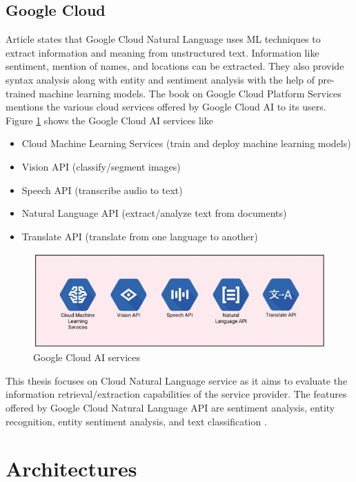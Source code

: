 \subsection{Google Cloud}
Article \cite{kozlenko2021machine} states that Google Cloud Natural Language uses \acs{ML} techniques to extract information and meaning from unstructured text. Information like sentiment, mention of names, and locations can be extracted. They also provide syntax analysis along with entity and sentiment analysis with the help of pre-trained machine learning models. 
The book on Google Cloud Platform Services \cite{Bisong2019} mentions the various cloud services offered by Google Cloud \acs{AI} to its users. Figure \ref{gcaiservices} \cite{Bisong2019} shows the Google Cloud \acs{AI} services like 
\begin{itemize}
    \item Cloud Machine Learning Services (train and deploy machine learning models)
    \item Vision \acs{API} (classify/segment images)
    \item Speech \acs{API} (transcribe audio to text)
    \item Natural Language \acs{API} (extract/analyze text from documents)
    \item Translate \acs{API} (translate from one language to another)
\end{itemize}
\begin {figure}[h!h]
\centering
\includegraphics[scale=0.85]{images/Chapter2/google_cloud_ai_services.png}
\caption{Google Cloud \acs{AI} services}
\label{gcaiservices}
\end {figure}
This thesis focuses on Cloud Natural Language service as it aims to evaluate the information retrieval/extraction capabilities of the service provider. The features offered by Google Cloud Natural Language \acs{API} are sentiment analysis, entity recognition, entity sentiment analysis, and text classification \cite{gcdocs2}.

\section{Architectures}

